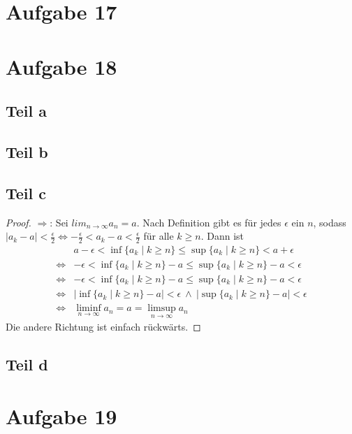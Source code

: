 \documentclass[10pt,a4paper]{article}
\begin{document}
\section{Aufgabe 17}

\section{Aufgabe 18}

\subsection{Teil a}

\subsection{Teil b}

\subsection{Teil c}
\begin{proof}
  $\Rightarrow$: Sei $lim_{n \rightarrow \infty} a_{n} = a$.
  Nach Definition gibt es für jedes $\epsilon$ ein $n$, sodass $|a_{k} - a| < \frac{\epsilon}{2} \Leftrightarrow -\frac{\epsilon}{2} < a_{k} - a < \frac{\epsilon}{2}$ für alle $k \ge n$.
  Dann ist
  \begin{align*}
    & a - \epsilon < \inf \{ a_{k} \mid k \ge n \} \le \sup \{ a_{k} \mid k \ge n \} < a + \epsilon\\
    \Leftrightarrow & -\epsilon < \inf \{ a_{k} \mid k \ge n \} - a \le \sup \{ a_{k} \mid k \ge n \} - a < \epsilon\\
    \Leftrightarrow & -\epsilon < \inf \{ a_{k} \mid k \ge n \} - a \le \sup \{ a_{k} \mid k \ge n \} - a < \epsilon\\
    \Leftrightarrow & |\inf \{ a_{k} \mid k \ge n \} - a| < \epsilon\ \land\ |\sup \{ a_{k} \mid k \ge n \} - a| < \epsilon\\
    \Leftrightarrow & \liminf_{n \rightarrow \infty} a_{n} = a = \limsup_{n \rightarrow \infty} a_{n}
  \end{align*}
  Die andere Richtung ist einfach rückwärts.
\end{proof}

\subsection{Teil d}

\section{Aufgabe 19}
\end{document}
